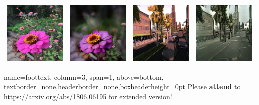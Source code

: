 \documentclass[landscape,a0paper,fontscale=0.285]{baposter} %
\begin{document}
\begin{poster}
{\begin{minipage}{1\linewidth}
\begin{tabular}{cccc}
  \includegraphics[width=.24\textwidth]{figures/others/flower1.jpg}&
  \includegraphics[width=.24\textwidth]{figures/others/flower2.jpg}&
 \includegraphics[width=.24\textwidth]{figures/others/epoch020_real_A.jpg}&
  \includegraphics[width=.24\textwidth]{figures/others/epoch020_fake_B.jpg}\\

\end{tabular}
\end{minipage}
}
\vspace{0.8em}
\headerbox{}%
{name=foottext, column=3, span=1, above=bottom,%
 textborder=none,headerborder=none,boxheaderheight=0pt}{
 Please \textbf{attend} to \url{https://arxiv.org/abs/1806.06195} for extended version!}



\end{poster}
\end{document}
